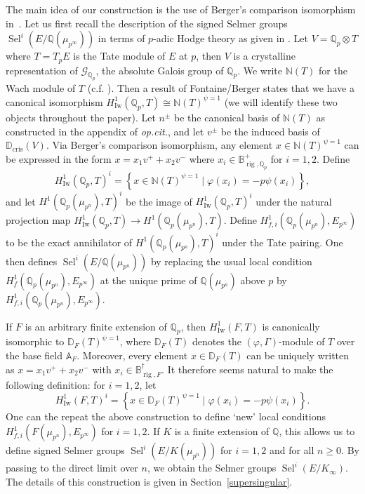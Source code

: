 \documentclass{amsart}
\newcommand{\QQ}{\mathbb Q}
\newcommand{\BB}{\mathbb B}
\newcommand{\DD}{\mathbb D}
\renewcommand{\AA}{\mathbb A}
\newcommand{\NN}{\mathbb N}
\DeclareMathOperator{\Sel}{Sel}
\DeclareMathOperator{\Iw}{Iw}
\DeclareMathOperator{\cris}{cris}
\DeclareMathOperator{\rig}{rig}
\newcommand{\Ep}{E_{p^\infty}}
\newcommand{\Qp}{\QQ_p}
\newcommand{\calG}{\mathcal{G}}
\newcommand{\vp}{\varphi}
\begin{document}
  The main idea of our construction is the use of Berger's comparison isomorphism in~\cite{berger02}. Let us first recall the description of the signed Selmer groups $\Sel^i(E\slash \QQ(\mu_{p^\infty}))$ in terms of $p$-adic Hodge theory as given in \cite{leiloefflerzerbes10}. Let $V=\QQ_p\otimes T$ where $T=T_pE$ is the Tate module of $E$ at $p$, then $V$ is a crystalline representation of $\calG_{\QQ_p}$, the absolute Galois group of $\Qp$. We write $\NN(T)$ for the Wach module of $T$ (c.f. \cite{berger03,wach96}). Then a result of Fontaine/Berger states that we have a canonical isomorphism $H^1_{\Iw}(\QQ_p,T)\cong \NN(T)^{\psi=1}$ (we will identify these two objects throughout the paper). Let $n^\pm$ be the canonical basis of $\NN(T)$ as constructed in the appendix of \emph{op.cit.}, and let $v^\pm$ be the induced basis of $\DD_{\cris}(V)$. Via Berger's comparison isomorphism, any element $x\in\NN(T)^{\psi=1}$ can be expressed in the form $x=x_1 v^++x_2v^-$ where $x_i\in\BB^+_{\rig,\QQ_p}$ for $i=1,2$. Define
   \[ H^1_{\Iw}(\QQ_p,T)^i=\left\{ x\in \NN(T)^{\psi=1}\mid \vp(x_i)=-p\psi(x_i)\right\},\]
  and let $H^1(\QQ_p(\mu_{p^n}),T)^i$ be the image of $H^1_{\Iw}(\QQ_p,T)^i$ under the natural projection map $H^1_{\Iw}(\QQ_p,T)\rightarrow H^1(\QQ_p(\mu_{p^n}),T)$. Define $H^1_{f,i}(\QQ_p(\mu_{p^n}),\Ep)$ to be the exact annihilator of $H^1(\QQ_p(\mu_{p^n}),T)^i$ under the Tate pairing. One then defines $\Sel^i(E\slash \QQ(\mu_{p^n}))$ by replacing the usual local condition $H^1_{f}(\QQ_p(\mu_{p^n}),\Ep)$ at the unique prime of $\QQ(\mu_{p^n})$ above $p$ by $H^1_{f,i}(\QQ_p(\mu_{p^n}),\Ep)$.
  
  If $F$ is an arbitrary finite extension of $\QQ_p$, then $H^1_{\Iw}(F,T)$ is canonically isomorphic to $\DD_F(T)^{\psi=1}$, where $\DD_F(T)$ denotes the $(\varphi,\Gamma)$-module of $T$ over the base field $\AA_F$. Moreover, every element $x\in \DD_F(T)$ can be uniquely written as $x=x_1v^++x_2v^-$ with $x_i\in\BB^\dagger_{\rig,F}$. It therefore seems natural to make the following definition: for $i=1,2$, let 
  \[ H^1_{\Iw}(F,T)^i=\left\{ x\in \DD_F(T)^{\psi=1}\mid \vp(x_i)=-p\psi(x_i)\right\}.\]
  One can the repeat the above construction to define `new' local conditions $H^1_{f,i}(F(\mu_{p^n}),\Ep)$ for $i=1,2$. If $K$ is a finite extension of $\QQ$, this allows us to define signed Selmer groups $\Sel^i(E\slash K(\mu_{p^n}))$ for $i=1,2$ and for all $n\geq 0$. By passing to the direct limit over $n$, we obtain the Selmer groups $\Sel^i(E\slash K_\infty)$. The details of this construction is given in Section~\ref{supersingular}.
\end{document}
